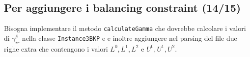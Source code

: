 \documentclass{scrartcl}
\begin{document}
\subsection{Per aggiungere i balancing constraint (14/15)}
Bisogna implementare il metodo \verb|calculateGamma| che dovrebbe calcolare i valori di $\gamma_{ir}^\delta$ nella classe \verb|Instance3BKP| e  
e inoltre aggiungere nel parsing del file due righe extra che contengono i valori
$L^0, L^1, L^2$ e $U^0, U^1, U^2$.
\end{document}
